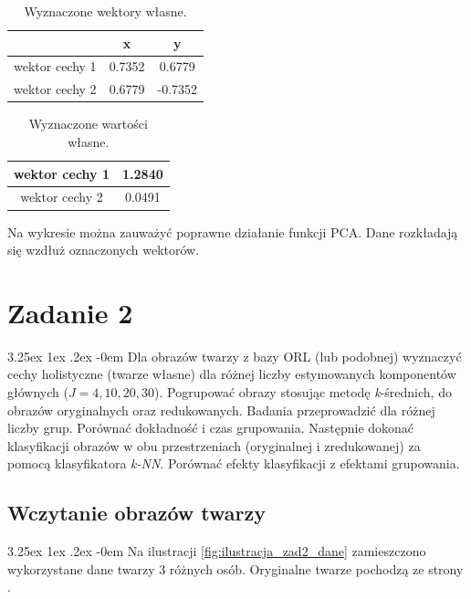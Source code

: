 \documentclass[11pt, a4paper]{article}
\makeatletter
\newcommand{\fbi}{\leavevmode{\parindent=1em\indent}}
\renewcommand\paragraph{\@startsection{paragraph}{5}{\z@}
  {3.25ex \@plus1ex \@minus.2ex}
  {-0em}
  {\normalfont\normalsize\bfseries}}
\makeatother
\begin{document}
\begin{table}[H]
	\centering
	\caption{Wyznaczone wektory własne.}
	\begin{tabular}{c|c|c|}
		\cline{2-3}
		& x & y \\ 
		\hline
		\multicolumn{1}{|c|}{wektor cechy 1} & 0.7352 & 0.6779 \\ 
		\hline 
		\multicolumn{1}{|c|}{wektor cechy 2} & 0.6779 & -0.7352 \\
		\hline 
	\end{tabular}
	\label{tab:wektory-wlasne}
\end{table}


\begin{table}[H]
	\centering
	\caption{Wyznaczone wartości własne.}
	\begin{tabular}{|c|c|}
		\hline 
		wektor cechy 1 & 1.2840 \\ 
		\hline 
		wektor cechy 2 & 0.0491 \\ 
		\hline
	\end{tabular}
	\label{tab:wartosci-wlasne}
\end{table}

\fbi
Na wykresie można zauważyć poprawne działanie funkcji PCA. Dane rozkładają się wzdłuż oznaczonych wektorów.

\section{Zadanie 2}
\paragraph{}
Dla obrazów twarzy z bazy ORL (lub podobnej) wyznaczyć cechy holistyczne (twarze własne) dla różnej liczby estymowanych komponentów głównych (\(J = 4, 10, 20, 30\)). Pogrupować obrazy stosując metodę \textit{k}-średnich, do obrazów oryginalnych oraz redukowanych. Badania przeprowadzić dla różnej liczby grup. Porównać dokładność i czas grupowania. Następnie dokonać klasyfikacji obrazów w obu przestrzeniach (oryginalnej i zredukowanej) za pomocą klasyfikatora \textit{k-NN}. Porównać efekty klasyfikacji z efektami grupowania.

\subsection{Wczytanie obrazów twarzy}
\paragraph{}
Na ilustracji \ref{fig:ilustracja_zad2_dane} zamieszczono wykorzystane dane twarzy 3 różnych osób. Oryginalne twarze pochodzą ze strony \cite{test6}.
\end{document}
